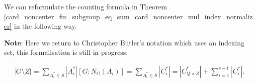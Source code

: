 \begin{footnotesize}





We can reformulate the counting formula in Theorem \ref{card_noncenter_fin_subgroup_eq_sum_card_noncenter_mul_index_normalizer} in the following way.

\textbf{Note}: Here we return to Christopher Butler's notation which uses an indexing set, this formalisation is still in progress.


\begin{align*} |G \! \setminus \! Z| = \sum_{A_i^* \in S} |A_i^*| [G:N_G(A_i)] = \sum_{A_i^* \in S} |C_i^*| = |C_{Q \times Z}^*| + \sum_{i=1}^{s+t} |C_i^*|.
\end{align*}


\end{footnotesize}
